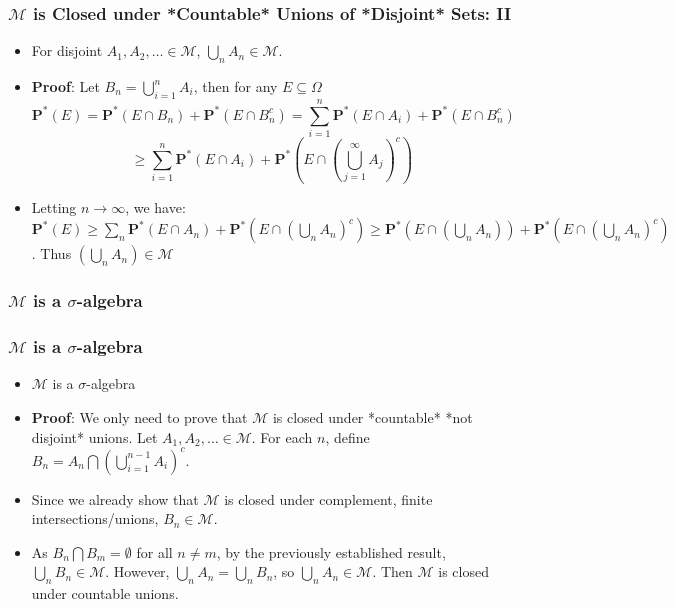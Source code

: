 \documentclass[handout]{beamer}
\newcommand{\BP}{\mathbf{P}}
\begin{document}
\frame
{
  \frametitle{$\mathcal{M}$ is Closed under *Countable* Unions of *Disjoint* Sets: II}

   \begin{itemize}

            \item<1->   [] \begin{Lemma}[2.3.13] For disjoint $A_1, A_2,\ldots \in \mathcal{M}$,  $\bigcup_{n} A_n\in \mathcal{M}$.                \end{Lemma}    
       
              \item<2-> []\textbf{Proof}: Let $B_n=\bigcup_{i=1}^n A_i$, then for any $E\subseteq \Omega$
$$ \BP^*( E) =   \BP^*( E\cap B_n)+ \BP^*(E\cap B_n^c)  
             = \sum_{i=1}^n \BP^*( E\cap A_{i})+ \BP^*(E\cap B_n^c)  $$
                $$   \geq \sum_{i=1}^n \BP^*( E\cap A_{i})+ \BP^*(  E\cap (\bigcup_{j=1}^{\infty} A_j) ^c) $$
                   
                   \item<3-> [] Letting $n \to \infty$, we have: 
                     $\BP^*( E) \geq \sum_{n} \BP^*( E\cap A_{n})+ \BP^*(  E\cap (\bigcup_{n} A_n) ^c)   \geq  \BP^*( E\cap (\bigcup_n A_{n}) )+ \BP^*(  E\cap (\bigcup_{n} A_n) ^c)$. Thus $(\bigcup_{n} A_n) \in \mathcal{M}$
   

\end{itemize}
}

\subsubsection{$\mathcal{M}$ is a $\sigma$-algebra}
\frame
{
  \frametitle{$\mathcal{M}$ is a $\sigma$-algebra}

   \begin{itemize}

            \item<1->   [] \begin{Lemma}[2.3.14] $\mathcal{M}$ is a $\sigma$-algebra  \end{Lemma}    
       
              \item<2-> []\textbf{Proof}: We only need to prove that $\mathcal{M}$ is closed under *countable* *not disjoint* unions. Let $A_1, A_2,\ldots \in \mathcal{M}$. For each $n$, define $B_n=A_n\bigcap (\bigcup_{i=1}^{n-1} A_i)^c$.                    
                   \item<3-> [] Since we already show that $\mathcal{M}$ is closed under complement, finite intersections/unions, $B_n\in \mathcal{M}$.
                   \item<4-> [] As $B_n\bigcap B_m=\emptyset$ for all $n\neq m$, by the previously established result, $\bigcup_n B_n \in \mathcal{M}$. However, $\bigcup_n A_n=\bigcup_n B_n$, so $\bigcup_n A_n \in \mathcal{M}$. Then $\mathcal{M}$ is closed under countable unions.
\end{itemize}
}
\end{document}
